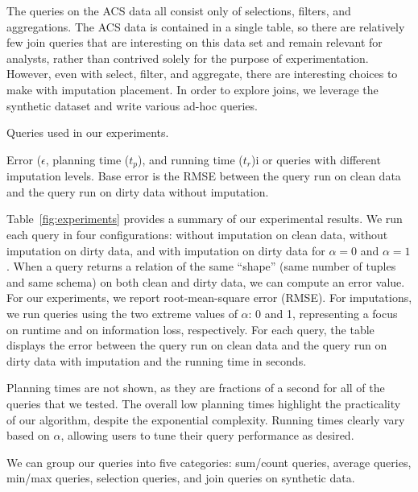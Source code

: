 The queries on the ACS data all consist only of selections, filters, and aggregations.
The ACS data is contained in a single table, so there are relatively few join queries that are interesting on this data set and remain relevant for analysts, rather
than contrived solely for the purpose of experimentation.
However, even with select, filter, and aggregate, there are interesting choices to make with imputation placement. In order to explore joins, we leverage the synthetic
dataset and write various ad-hoc queries.

\begin{table}
  \centerfloat
  
  \caption{Queries used in our experiments.}
  \label{fig:queries}
\end{table}

\begin{table}
  \centerfloat
  
    \caption{Error ($\epsilon$, planning time ($t_p$), and running time ($t_r$)i or queries
    with different imputation levels. Base error is the RMSE between the query run on clean
    data and the query run on dirty data without imputation. }
  \label{fig:experiments}
\end{table}

Table~\ref{fig:experiments} provides a summary of our experimental results.
We run each query in four configurations: without imputation on clean data, without imputation on dirty data, and with imputation on dirty data for $\alpha = 0$ and $\alpha = 1$.
When a query returns a relation of the same ``shape'' (same number of tuples and same schema) on both clean and dirty data, we can compute an error value.
For our experiments, we report root-mean-square error (RMSE).
For imputations, we run queries using the two extreme values of $\alpha$: 0 and 1, representing a focus on runtime and on information loss, respectively.
For each query, the table displays the error between the query run on clean data and the query run on dirty data with imputation and the running time in seconds.

Planning times are not shown, as they are fractions of a second for all of the queries that we tested.
The overall low planning times highlight the practicality of our algorithm, despite the exponential complexity.
Running times clearly vary based on $\alpha$, allowing users to tune their query performance as desired.

We can group our queries into five categories: sum/count queries, average queries, min/max queries, selection queries, and join queries on synthetic data.

